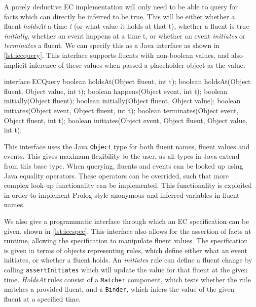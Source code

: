 A purely deductive \ac{EC} implementation will only need to be able to query
for facts which can directly be inferred to be true. This will be either
whether a fluent \emph{holdsAt} a time \emph{t} (or what value it holds at
that t), whether a fluent is true \emph{initially}, whether an event happens
at a time t, or whether an event \emph{initiates} or \emph{terminates} a
fluent. We can specify this as a Java interface as shown in
\autoref{lst:iecquery}. This interface supports fluents with non-boolean
values, and also implicit inference of these values when passed a placeholder
object as the value.

\begin{java}[label=lst:iecquery,caption=Java interface for deductive queries on an EC Specification]
interface ECQuery {
	boolean holdsAt(Object fluent, int t);
	boolean holdsAt(Object fluent, Object value, int t);
	boolean happens(Object event, int t);
	boolean initially(Object fluent);
	boolean initially(Object fluent, Object value);
	boolean initiates(Object event, Object fluent, int t);
	boolean terminates(Object event, Object fluent, int t);
	boolean initiates(Object event, Object fluent, Object value, int t);
}
\end{java}

This interface uses the Java \texttt{Object} type for both fluent names,
fluent values and events. This gives maximum flexibility to the user, as all
types in Java extend from this base type. When querying, fluents and events
can be looked up using Java equality operators. These operators can be
overrided, such that more complex look-up functionality can be implemented.
This functionality is exploited in order to implement Prolog-style anonymous
and inferred variables in fluent names.

We also give a programmatic interface through which an \ac{EC} specification
can be given, shown in \autoref{lst:iecspec}. This interface also allows for
the assertion of facts at runtime, allowing the specification to manipulate
fluent values. The specification is given in terms of objects representing
rules, which define either what an event initiates, or whether a fluent holds.
An \emph{initiates} rule can define a fluent change by calling
\texttt{assertInitiates} which will update the value for that fluent at the
given time. \emph{HoldsAt} rules consist of a \texttt{Matcher} component, which
tests whether the rule matches a provided fluent, and a \texttt{Binder}, which
infers the value of the given fluent at a specified time.

